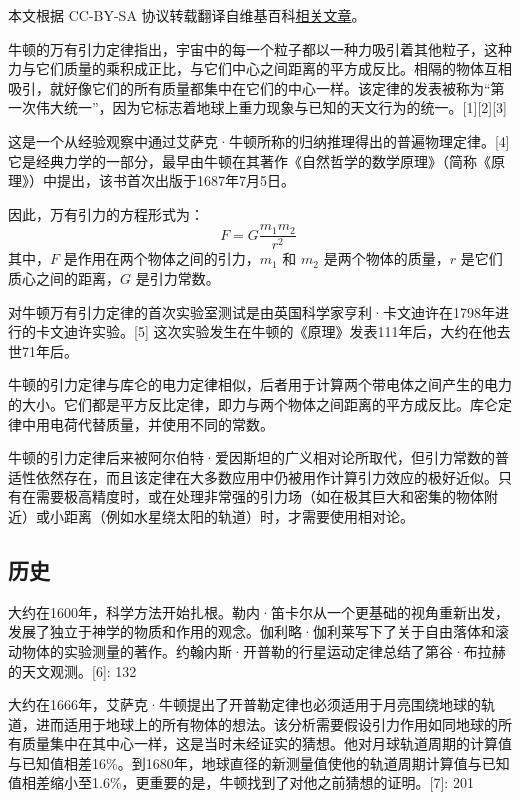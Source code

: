 

本文根据 CC-BY-SA 协议转载翻译自维基百科\href{https://en.wikipedia.org/wiki/Newton\%27s_law_of_universal_gravitation}{相关文章}。

牛顿的万有引力定律指出，宇宙中的每一个粒子都以一种力吸引着其他粒子，这种力与它们质量的乘积成正比，与它们中心之间距离的平方成反比。相隔的物体互相吸引，就好像它们的所有质量都集中在它们的中心一样。该定律的发表被称为“第一次伟大统一”，因为它标志着地球上重力现象与已知的天文行为的统一。[1][2][3]

这是一个从经验观察中通过艾萨克·牛顿所称的归纳推理得出的普遍物理定律。[4] 它是经典力学的一部分，最早由牛顿在其著作《自然哲学的数学原理》（简称《原理》）中提出，该书首次出版于1687年7月5日。

因此，万有引力的方程形式为：
\[
F = G \frac{{m_1 m_2}}{{r^2}}~
\]
其中，\( F \) 是作用在两个物体之间的引力，\( m_1 \) 和 \( m_2 \) 是两个物体的质量，\( r \) 是它们质心之间的距离，\( G \) 是引力常数。

对牛顿万有引力定律的首次实验室测试是由英国科学家亨利·卡文迪许在1798年进行的卡文迪许实验。[5] 这次实验发生在牛顿的《原理》发表111年后，大约在他去世71年后。

牛顿的引力定律与库仑的电力定律相似，后者用于计算两个带电体之间产生的电力的大小。它们都是平方反比定律，即力与两个物体之间距离的平方成反比。库仑定律中用电荷代替质量，并使用不同的常数。

牛顿的引力定律后来被阿尔伯特·爱因斯坦的广义相对论所取代，但引力常数的普适性依然存在，而且该定律在大多数应用中仍被用作计算引力效应的极好近似。只有在需要极高精度时，或在处理非常强的引力场（如在极其巨大和密集的物体附近）或小距离（例如水星绕太阳的轨道）时，才需要使用相对论。
\subsection{历史}   
大约在1600年，科学方法开始扎根。勒内·笛卡尔从一个更基础的视角重新出发，发展了独立于神学的物质和作用的观念。伽利略·伽利莱写下了关于自由落体和滚动物体的实验测量的著作。约翰内斯·开普勒的行星运动定律总结了第谷·布拉赫的天文观测。[6]: 132  

大约在1666年，艾萨克·牛顿提出了开普勒定律也必须适用于月亮围绕地球的轨道，进而适用于地球上的所有物体的想法。该分析需要假设引力作用如同地球的所有质量集中在其中心一样，这是当时未经证实的猜想。他对月球轨道周期的计算值与已知值相差16\%。到1680年，地球直径的新测量值使他的轨道周期计算值与已知值相差缩小至1.6\%，更重要的是，牛顿找到了对他之前猜想的证明。[7]: 201  

